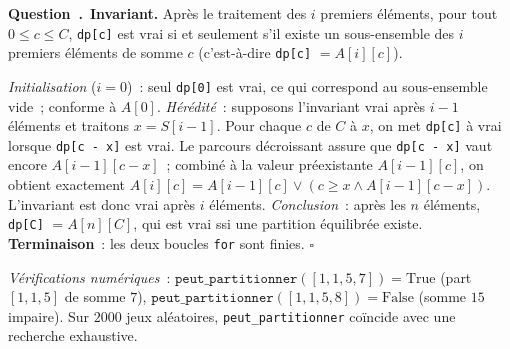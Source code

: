 \documentclass[11pt,a4paper]{article}
\newcounter{qcnt}
\newcommand{\Q}{\medskip\par\stepcounter{qcnt}\noindent\textbf{Question~\theqcnt.}~}
\newcommand{\code}[1]{\lstinline!#1!}
\begin{document}
\Q \textbf{Invariant.} Après le traitement des $i$ premiers éléments, pour tout
$0 \le c \le C$, \code{dp[c]} est vrai si et seulement s'il existe un sous-ensemble des $i$
premiers éléments de somme $c$ (c'est-à-dire \code{dp[c]} $= A[i][c]$).

\noindent\emph{Initialisation} ($i=0$)~: seul \code{dp[0]} est vrai, ce qui correspond au
sous-ensemble vide~; conforme à $A[0]$. \emph{Hérédité}~: supposons l'invariant vrai après $i-1$
éléments et traitons $x = S[i-1]$. Pour chaque $c$ de $C$ à $x$, on met \code{dp[c]} à vrai
lorsque \code{dp[c - x]} est vrai. Le parcours décroissant assure que \code{dp[c - x]} vaut encore
$A[i-1][c-x]$~; combiné à la valeur préexistante $A[i-1][c]$, on obtient exactement
$A[i][c] = A[i-1][c] \lor (c \ge x \land A[i-1][c-x])$. L'invariant est donc vrai après $i$
éléments. \emph{Conclusion}~: après les $n$ éléments, \code{dp[C]} $= A[n][C]$, qui est vrai ssi
une partition équilibrée existe. \textbf{Terminaison}~: les deux boucles \code{for} sont finies.
$\square$

\medskip
\noindent\emph{Vérifications numériques}~: $\mathtt{peut\_partitionner}([1,1,5,7]) = \text{True}$
(part $[1,1,5]$ de somme $7$), $\mathtt{peut\_partitionner}([1,1,5,8]) = \text{False}$ (somme
$15$ impaire). Sur $2000$ jeux aléatoires, \code{peut_partitionner} coïncide avec une recherche
exhaustive.
\end{document}
